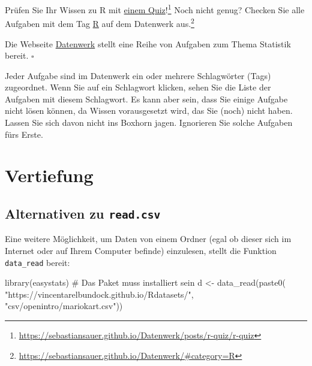 \documentclass[
  letterpaper,
  oneside,
  open=any]{scrbook}
\newenvironment{Shaded}{\begin{snugshade}}{\end{snugshade}}
\newcommand{\CommentTok}[1]{\textcolor[rgb]{0.37,0.37,0.37}{#1}}
\newcommand{\FunctionTok}[1]{\textcolor[rgb]{0.28,0.35,0.67}{#1}}
\newcommand{\NormalTok}[1]{\textcolor[rgb]{0.00,0.23,0.31}{#1}}
\newcommand{\OtherTok}[1]{\textcolor[rgb]{0.00,0.23,0.31}{#1}}
\newcommand{\StringTok}[1]{\textcolor[rgb]{0.13,0.47,0.30}{#1}}
\theoremstyle{definition}
\theoremstyle{definition}
\theoremstyle{definition}
\theoremstyle{remark}
\begin{document}
Prüfen Sie Ihr Wissen zu R mit
\href{https://sebastiansauer.github.io/Datenwerk/posts/r-quiz/r-quiz}{einem
Quiz}!\footnote{\url{https://sebastiansauer.github.io/Datenwerk/posts/r-quiz/r-quiz}}
Noch nicht genug? Checken Sie alle Aufgaben mit dem Tag
\href{https://sebastiansauer.github.io/Datenwerk/\#category=R}{R} auf
dem Datenwerk aus.\footnote{\url{https://sebastiansauer.github.io/Datenwerk/\#category=R}}

\begin{tcolorbox}[enhanced jigsaw, bottomrule=.15mm, left=2mm, colbacktitle=quarto-callout-note-color!10!white, bottomtitle=1mm, colframe=quarto-callout-note-color-frame, coltitle=black, rightrule=.15mm, breakable, toptitle=1mm, titlerule=0mm, title=\textcolor{quarto-callout-note-color}{\faInfo}\hspace{0.5em}{Hinweis}, opacitybacktitle=0.6, arc=.35mm, colback=white, leftrule=.75mm, opacityback=0, toprule=.15mm]

Die Webseite
\href{https://sebastiansauer.github.io/Datenwerk/}{Datenwerk} stellt
eine Reihe von Aufgaben zum Thema Statistik bereit. \(\square\)

\end{tcolorbox}

Jeder Aufgabe sind im Datenwerk ein oder mehrere Schlagwörter (Tags)
zugeordnet. Wenn Sie auf ein Schlagwort klicken, sehen Sie die Liste der
Aufgaben mit diesem Schlagwort. Es kann aber sein, dass Sie einige
Aufgabe nicht lösen können, da Wissen vorausgesetzt wird, das Sie (noch)
nicht haben. Lassen Sie sich davon nicht ins Boxhorn jagen. Ignorieren
Sie solche Aufgaben fürs Erste.

\section{Vertiefung}\label{vertiefung-2}

\subsection{\texorpdfstring{Alternativen zu
\texttt{read.csv}}{Alternativen zu read.csv}}\label{alternativen-zu-read.csv}

Eine weitere Möglichkeit, um Daten von einem Ordner (egal ob dieser sich
im Internet oder auf Ihrem Computer befinde) einzulesen, stellt die
Funktion \texttt{data\_read} bereit:

\begin{Shaded}
\begin{Highlighting}[]
\FunctionTok{library}\NormalTok{(easystats)  }\CommentTok{\# Das Paket muss installiert sein}
\NormalTok{d }\OtherTok{\textless{}{-}} \FunctionTok{data\_read}\NormalTok{(}\FunctionTok{paste0}\NormalTok{(}
  \StringTok{"https://vincentarelbundock.github.io/Rdatasets/"}\NormalTok{,}
  \StringTok{"csv/openintro/mariokart.csv"}\NormalTok{))}
\end{Highlighting}
\end{Shaded}
\end{document}
